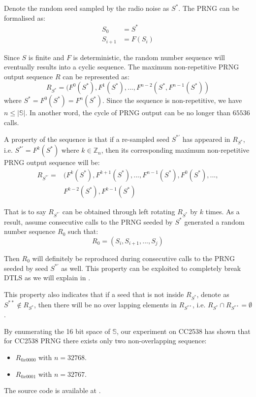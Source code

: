 Denote the random seed sampled by the radio noise as $S^*$. The PRNG can be formalised as:
\begin{equation}
	\begin{aligned}
	S_{0} &= S^* \\
	S_{i+1} &= F(S_{i})
	\end{aligned}
\end{equation}

Since ${S}$ is finite and $F$ is deterministic, the random number sequence will eventually results into a cyclic sequence. The maximum non-repetitive PRNG output sequence $R$ can be represented as:
\begin{equation}
R_{S^*}= (F^0(S^{*}), F^{1}(S^{*}), ..., F^{n-2}(S^{*}, F^{n-1}(S^{*}))
\end{equation}
where $S^{*} = F^{0}(S^{*}) = F^{n}(S^{*})$. Since the sequence is non-repetitive, we have $n \leq |\mathbb{S}|$. In another word, the cycle of PRNG output can be no longer than $65536$ calls.

A property of the sequence is that if a re-sampled seed $S^{*'}$ has appeared in $R_{S^*}$, i.e. $S^{*'} = F^{k}(S^*)$ where $k \in \mathbb{Z}_n$, then its corresponding maximum non-repetitive PRNG output sequence will be:
\begin{equation}
	\begin{aligned}
	R_{S^{*'}} = &( F^{k}(S^*), F^{k+1}(S^{*}), ..., F^{n-1}(S^*), F^{0}(S^*), ...,\\
	&F^{k-2}(S^{*}), F^{k-1}(S^{*})
	\end{aligned}
\end{equation}

That is to say $R_{S^{*'}}$ can be obtained through left rotating $R_{S^*}$ by $k$ times. As a result, assume consecutive calls to the PRNG seeded by $S^*$ generated a random number sequence $R_0$ such that:
\begin{equation}
R_0 = (S_i, S_{i+1}, ..., S_{j})
\end{equation}

Then $R_0$ will definitely be reproduced during consecutive calls to the PRNG seeded by seed $S^{*'}$ as well. This property can be exploited to completely break DTLS as we will explain in .

This property also indicates that if a seed that is not inside $R_{S^*}$, denote as $S^{**} \notin R_{S^*}$, then there will be no over lapping elements in $R_{S^{**}}$, i.e. $R_{S^{*}} \cap R_{S^{**}} = \emptyset$.

By enumerating the 16 bit space of $\mathbb{S}$, our experiment on CC2538 has shown that for CC2538 PRNG there exists only two non-overlapping sequence:
\begin{itemize}
	\item $R_{0x0000}$ with $n = 32768$.
	\item $R_{0x0001}$ with $n = 32767$.
\end{itemize}
The source code is available at \cite{prngtest}.

